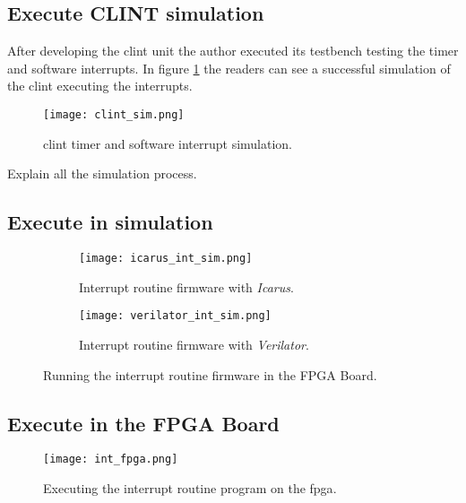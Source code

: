 \subsection{Execute CLINT simulation}
After developing the \acrshort{clint} unit the author executed its testbench testing the timer and software interrupts. In figure \ref{fig:clint_sim} the readers can see a successful simulation of the \acrshort{clint} executing the interrupts.

\begin{figure}[!ht]
    \centering
    \texttt{[image: clint\_sim.png]}
    \caption{\acrshort{clint} timer and software interrupt simulation.}
    \label{fig:clint_sim}
\end{figure}

Explain all the simulation process.

\subsection{Execute in simulation}
\begin{figure}[!ht]
    \centering
    \begin{subfigure}[b]{0.49\textwidth}
        \centering
        \texttt{[image: icarus\_int\_sim.png]}
        \caption{Interrupt routine firmware with \textit{Icarus}.}
        \label{fig:icarus_int_sim}
    \end{subfigure}
    \hfill
    \begin{subfigure}[b]{0.49\textwidth}
        \centering
        \texttt{[image: verilator\_int\_sim.png]}
        \caption{Interrupt routine firmware with \textit{Verilator}.}
        \label{fig:verilator_int_sim}
    \end{subfigure}
    \caption{Running the interrupt routine firmware in the FPGA Board.}
    \label{fig:int_sim}
\end{figure}

\subsection{Execute in the FPGA Board}

\begin{figure}[!ht]
    \centering
    \texttt{[image: int\_fpga.png]}
    \caption{Executing the interrupt routine program on the \acrshort{fpga}.}
    \label{fig:int_fpga}
\end{figure}

